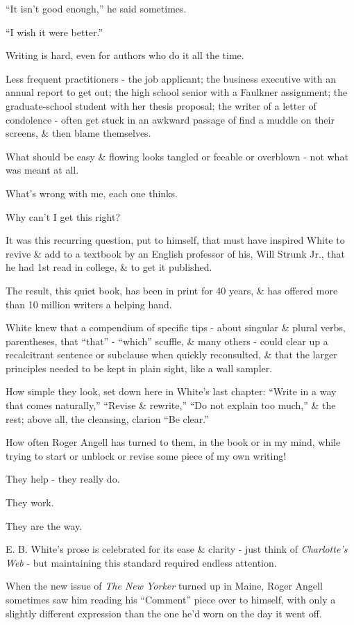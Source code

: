\documentclass{article}
\begin{document}
``It isn't good enough,'' he said sometimes.

``I wish it were better.''

%
Writing is hard, even for authors who do it all the time.

Less frequent practitioners - the job applicant; the business executive with an annual report to get out; the high school senior with a Faulkner assignment; the graduate-school student with her thesis proposal; the writer of a letter of condolence - often get stuck in an awkward passage of find a muddle on their screens, \& then blame themselves.

What should be easy \& flowing looks tangled or feeable or overblown - not what was meant at all.

What's wrong with me, each one thinks.

Why can't I get this right?

%
It was this recurring question, put to himself, that must have inspired White to revive \& add to a textbook by an English professor of his, Will Strunk Jr., that he had 1st read in college, \& to get it published.

The result, this quiet book, has been in print for 40 years, \& has offered more than 10 million writers a helping hand.

White knew that a compendium of specific tips - about singular \& plural verbs, parentheses, that ``that'' - ``which'' scuffle, \& many others - could clear up a recalcitrant sentence or subclause when quickly reconsulted, \& that the larger principles needed to be kept in plain sight, like a wall sampler.

%
How simple they look, set down here in White's last chapter: ``Write in a way that comes naturally,'' ``Revise \& rewrite,'' ``Do not explain too much,'' \& the rest; above all, the cleansing, clarion ``Be clear.''

How often Roger Angell has turned to them, in the book or in my mind, while trying to start or unblock or revise some piece of my own writing!

They help - they really do.

They work.

They are the way.

%
E. B. White's prose is celebrated for its ease \& clarity - just think of {\it Charlotte's Web} - but maintaining this standard required endless attention.

When the new issue of {\it The New Yorker} turned up in Maine, Roger Angell sometimes saw him reading his ``Comment'' piece over to himself, with only a slightly different expression than the one he'd worn on the day it went off.
\end{document}
